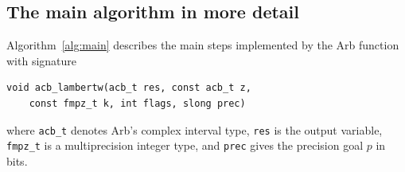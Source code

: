 \documentclass[11pt,a4paper]{article}
\begin{document}
\subsection{The main algorithm in more detail}

Algorithm~\ref{alg:main} describes the main steps
implemented by the Arb function with signature

\begin{verbatim}
void acb_lambertw(acb_t res, const acb_t z,
    const fmpz_t k, int flags, slong prec)
\end{verbatim}

where \texttt{acb\_t} denotes Arb's complex interval type,
\texttt{res} is the output variable, \texttt{fmpz\_t}
is a multiprecision integer type, and
\texttt{prec} gives the precision goal $p$ in bits.
\end{document}
